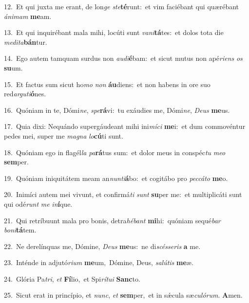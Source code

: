 {\numbfont\textcolor{\numbcolor}{12.}}~Et qui juxta me erant, de lon\textit{ge} \textit{ste}\-\textbf{té}runt:~\star et vim faciébant qui quærébant \textit{á}\-\textit{ni}\textit{mam} \textbf{me}\-am.\par
{\numbfont\textcolor{\numbcolor}{13.}}~Et qui inquirébant mala mihi, locúti sunt \textit{va}\-\textit{ni}\textbf{tá}tes:~\star et dolos tota die \textit{me}\-\textit{di}\textit{ta}\textbf{bán}tur.\par
{\numbfont\textcolor{\numbcolor}{14.}}~Ego autem tamquam surdus non \textit{au}\-\textit{di}\textbf{é}bam:~\star et sicut mutus non apé\-\textit{ri}\-\textit{ens} \textit{os} \textbf{su}\-um.\par
{\numbfont\textcolor{\numbcolor}{15.}}~Et factus sum sicut ho\textit{mo} \textit{non} \textbf{áu}\-diens:~\star et non habens in ore suo red\-\textit{ar}\-\textit{gu}\textit{ti}\textbf{ó}nes.\par
{\numbfont\textcolor{\numbcolor}{16.}}~Quóniam in te, Dómi\-\textit{ne}\-, \textit{spe}\-\textbf{rá}vi:~\star tu exáudies me, Dómi\-\textit{ne}\-, \textit{De}\-\textit{us} \textbf{me}\-us.\par
{\numbfont\textcolor{\numbcolor}{17.}}~Quia dixi: Nequándo supergáudeant mihi ini\-\textit{mí}\-\textit{ci} \textbf{me}\-i:~\star et dum commovéntur pedes mei, super me \textit{ma}\-\textit{gna} \textit{lo}\-\textbf{cú}ti sunt.\par
{\numbfont\textcolor{\numbcolor}{18.}}~Quóniam ego in flagél\textit{la} \textit{pa}\-\textbf{rá}tus sum:~\star et dolor meus in conspéc\textit{tu} \textit{me}\-\textit{o} \textbf{sem}\-per.\par
{\numbfont\textcolor{\numbcolor}{19.}}~Quóniam iniquitátem meam an\-\textit{nun}\-\textit{ti}\textbf{á}bo:~\star et cogitábo pro \textit{pec}\-\textit{cá}\textit{to} \textbf{me}\-o.\par
{\numbfont\textcolor{\numbcolor}{20.}}~Inimíci autem mei vivunt, et confirmá\textit{ti} \textit{sunt} \textbf{su}\-per me:~\star et multiplicáti sunt qui odé\textit{runt} \textit{me} \textit{in}\-\textbf{í}que.\par
{\numbfont\textcolor{\numbcolor}{21.}}~Qui retríbuunt mala pro bonis, detra\-\textit{hé}\-\textit{bant} \textbf{mi}\-hi:~\star quóniam sequé\textit{bar} \textit{bo}\-\textit{ni}\textbf{tá}tem.\par
{\numbfont\textcolor{\numbcolor}{22.}}~Ne derelínquas me, Dómine, \textit{De}\-\textit{us} \textbf{me}\-us:~\star ne di\-\textit{scés}\-\textit{se}\textit{ris} \textbf{a} me.\par
{\numbfont\textcolor{\numbcolor}{23.}}~Inténde in adjutó\-\textit{ri}\-\textit{um} \textbf{me}\-um,~\star Dómine, Deus, \textit{sa}\-\textit{lú}\textit{tis} \textbf{me}\-æ.\par
{\numbfont\textcolor{\numbcolor}{24.}}~Glória Pa\-\textit{tri}\-, \textit{et} \textbf{Fí}\-lio,~\star et Spi\-\textit{rí}\-\textit{tu}\textit{i} \textbf{Sanc}\-to.\par
{\numbfont\textcolor{\numbcolor}{25.}}~Sicut erat in princípio, et \textit{nunc}\-, \textit{et} \textbf{sem}\-per,~\star et in sǽcula sæ\-\textit{cu}\-\textit{ló}\textit{rum}. \textbf{A}\-men.\par
